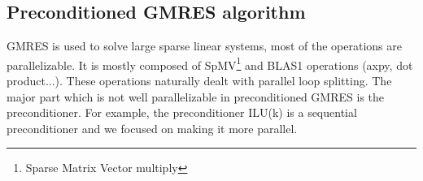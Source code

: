 \subsection{Preconditioned GMRES algorithm}
GMRES is used to solve large sparse linear systems, most of the operations are parallelizable.
%
It is mostly composed of SpMV\footnote{Sparse Matrix Vector multiply} and BLAS1 operations (axpy, dot product...).
%
These operations naturally dealt with parallel loop splitting.
%
The major part which is not well parallelizable in preconditioned GMRES is the preconditioner.
%
For example, the preconditioner ILU(k) is a sequential preconditioner and we focused on making it more parallel.



